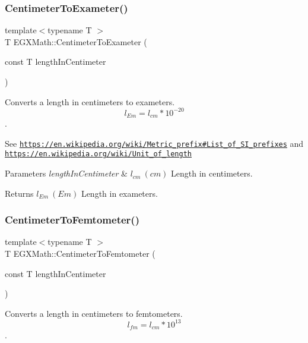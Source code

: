 \subsubsection{\texorpdfstring{Centimeter\+To\+Exameter()}{CentimeterToExameter()}}
{\footnotesize\ttfamily template$<$typename T $>$ \\
T E\+G\+X\+Math\+::\+Centimeter\+To\+Exameter (\begin{DoxyParamCaption}\item[{const T}]{length\+In\+Centimeter }\end{DoxyParamCaption})}



Converts a length in centimeters to exameters. \[ l_{Em}=l_{cm} * 10^{-20} \]. 

See \href{https://en.wikipedia.org/wiki/Metric_prefix#List_of_SI_prefixes}{\tt https\+://en.\+wikipedia.\+org/wiki/\+Metric\+\_\+prefix\#\+List\+\_\+of\+\_\+\+S\+I\+\_\+prefixes} and \href{https://en.wikipedia.org/wiki/Unit_of_length}{\tt https\+://en.\+wikipedia.\+org/wiki/\+Unit\+\_\+of\+\_\+length} 
\begin{DoxyParams}{Parameters}
{\em length\+In\+Centimeter} & $ l_{cm}\ (cm)$ Length in centimeters. \\
\hline
\end{DoxyParams}
\begin{DoxyReturn}{Returns}
$ l_{Em}\ (Em)$ Length in exameters. 
\end{DoxyReturn}
\mbox{\label{group___e_g_x_math-_conversions-_length_conversions-_s_i-_centimeter-_s_i_ga1d86301dcf9e8d9d75127c3d998f9c0b}} 
\subsubsection{\texorpdfstring{Centimeter\+To\+Femtometer()}{CentimeterToFemtometer()}}
{\footnotesize\ttfamily template$<$typename T $>$ \\
T E\+G\+X\+Math\+::\+Centimeter\+To\+Femtometer (\begin{DoxyParamCaption}\item[{const T}]{length\+In\+Centimeter }\end{DoxyParamCaption})}



Converts a length in centimeters to femtometers. \[ l_{fm}=l_{cm} * 10^{13} \]. 

